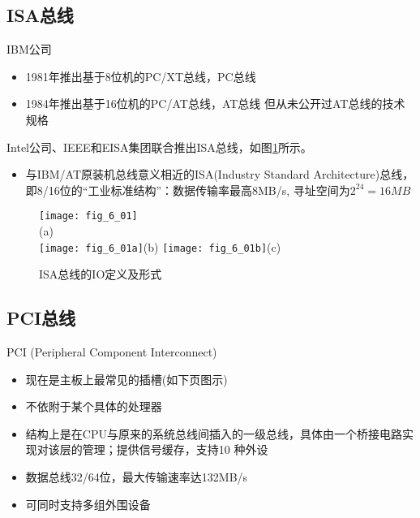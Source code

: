\subsection{ISA总线}
IBM公司


\begin{itemize}
  \item 1981年推出基于8位机的PC/XT总线，PC总线
  \item 1984年推出基于16位机的PC/AT总线，AT总线
    但从未公开过AT总线的技术规格
\end{itemize}

Intel公司、IEEE和EISA集团联合推出ISA总线，如图\ref{fig_6_01}所示。

\begin{itemize}
  \item 与IBM/AT原装机总线意义相近的ISA(Industry Standard Architecture)总线，即8/16位的“工业标准结构”：数据传输率最高8MB/s, 寻址空间为$2^{24}=16MB$
\end{itemize}

\begin{figure}
  \centering
  \texttt{[image: fig\_6\_01]}\\(a)\\
  \texttt{[image: fig\_6\_01a]}(b)
  \texttt{[image: fig\_6\_01b]}(c)\\
  \caption{ISA总线的IO定义及形式}\label{fig_6_01}
\end{figure}



\subsection{PCI总线}

PCI (Peripheral Component Interconnect)
\begin{itemize}
  \item 现在是主板上最常见的插槽(如下页图示)

  \item 不依附于某个具体的处理器
  \item 结构上是在CPU与原来的系统总线间插入的一级总线，具体由一个桥接电路实现对该层的管理；提供信号缓存，支持10 种外设

  \item 数据总线32/64位，最大传输速率达132MB/s

  \item 可同时支持多组外围设备

\end{itemize}

